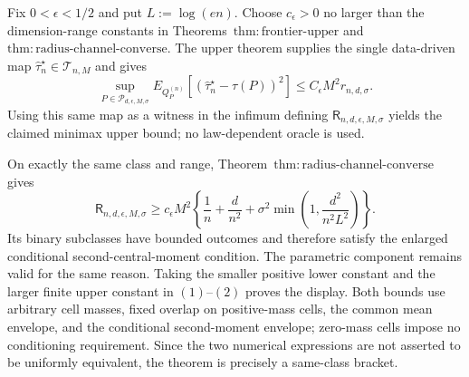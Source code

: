 Fix \(0<\epsilon<1/2\) and put \(L:=\log(en)\).  Choose \(c_\epsilon>0\) no larger than the dimension-range constants in Theorems~\(\mathrm{thm:frontier\text{-}upper}\) and \(\mathrm{thm:radius\text{-}channel\text{-}converse}\).  The upper theorem supplies the single data-driven map \(\widehat\tau_n^\star\in\mathcal T_{n,M}\) and gives
\[
 \sup_{P\in\mathcal P_{d,\epsilon,M,\sigma}}
 E_{Q_P^{(n)}}[(\widehat\tau_n^\star-\tau(P))^2]
 \le C_\epsilon M^2r_{n,d,\sigma}.
\tag{1}
\]
Using this same map as a witness in the infimum defining \(\mathsf R_{n,d,\epsilon,M,\sigma}\) yields the claimed minimax upper bound; no law-dependent oracle is used.

On exactly the same class and range, Theorem~\(\mathrm{thm:radius\text{-}channel\text{-}converse}\) gives
\[
 \mathsf R_{n,d,\epsilon,M,\sigma}
 \ge c_\epsilon M^2\left\{\frac1n+\frac d{n^2}
 +\sigma^2\min\left(1,\frac{d^2}{n^2L^2}\right)\right\}.
\tag{2}
\]
Its binary subclasses have bounded outcomes and therefore satisfy the enlarged conditional second-central-moment condition.  The parametric component remains valid for the same reason.  Taking the smaller positive lower constant and the larger finite upper constant in \((1)\)--\((2)\) proves the display.  Both bounds use arbitrary cell masses, fixed overlap on positive-mass cells, the common mean envelope, and the conditional second-moment envelope; zero-mass cells impose no conditioning requirement.  Since the two numerical expressions are not asserted to be uniformly equivalent, the theorem is precisely a same-class bracket.